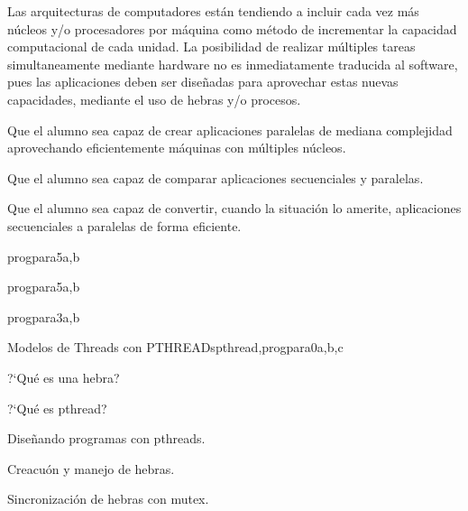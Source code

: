 \begin{syllabus}


\begin{justification}
Las arquitecturas de computadores están tendiendo a incluir cada vez más núcleos 
y/o procesadores por máquina como método de incrementar la capacidad computacional
de cada unidad. La posibilidad de realizar múltiples tareas simultaneamente mediante hardware 
no es inmediatamente traducida al software, pues las aplicaciones deben 
ser diseñadas para aprovechar estas nuevas capacidades, mediante el uso de hebras y/o procesos.
\end{justification}

\begin{goals}
\item Que el alumno sea capaz de crear aplicaciones paralelas de mediana complejidad aprovechando eficientemente máquinas con múltiples núcleos.
\item Que el alumno sea capaz de comparar aplicaciones secuenciales y paralelas.
\item Que el alumno sea capaz de convertir, cuando la situación lo amerite, aplicaciones secuenciales a paralelas de forma eficiente.
\end{goals}



\begin{unit}{\CNParallelComputationDef}{}{progpara}{5}{a,b}
      \CNParallelComputationAllTopics %
      \CNParallelComputationAllObjectives
\end{unit}

\begin{unit}{\ARMultiprocessingDef}{}{progpara}{5}{a,b}
      \ARMultiprocessingAllTopics
      \ARMultiprocessingAllObjectives
\end{unit}

\begin{unit}{\ALParallelAlgorithmsDef}{}{progpara}{3}{a,b}
      \ALParallelAlgorithmsAllTopics %
      \ALParallelAlgorithmsAllObjectives
\end{unit}

\begin{unit}{Modelos de Threads con PTHREADs}{}{pthread,progpara}{0}{a,b,c}
\begin{topics}
         \item ?`Qué es una hebra?
         \item ?`Qué es  pthread?
         \item Diseñando programas con pthreads.
         \item Creacuón y manejo de hebras.
         \item Sincronización de hebras con mutex.
\end{topics}


\end{unit}
\end{syllabus}
